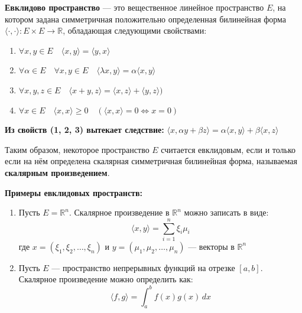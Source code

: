 \begin{shdef}
    \begin{definition}
        \leavevmode\newline
        
        \textbf{Евклидово пространство} — это вещественное линейное пространство $E$, на котором задана симметричная положительно определенная билинейная форма $\langle \cdot, \cdot \rangle: E \times E \to \mathbb{R}$, обладающая следующими свойствами:
        \begin{enumerate}
            \item $\forall x, y \in E \quad \langle x, y \rangle = \langle y, x \rangle$
            \item $\forall \alpha \in E \quad \forall x, y \in E \quad \langle \lambda x, y \rangle = \alpha \langle x, y \rangle$
            \item $\forall x, y, z \in E \quad \langle x + y,z \rangle = \langle x,z \rangle + \langle y,z \rangle)$
            \item $\forall x \in E \quad \langle x, x \rangle \geq 0 \quad (\langle x,x \rangle = 0 \Longleftrightarrow x = 0)$
        \end{enumerate}
        \vspace{0.3cm}
        \textbf{Из свойств (1, 2, 3) вытекает следствие:} $\langle x, \alpha y + \beta z \rangle = \alpha \langle x,y \rangle + \beta \langle x,z \rangle$
    \end{definition}
\end{shdef}
\vspace{2.0cm}
Таким образом, некоторое пространство $E$ считается евклидовым, если и только если на нём определена скалярная симметричная билинейная форма, называемая \textbf{скалярным произведением}.

\clearpage
\textbf{Примеры евклидовых пространств:}
\begin{shex}
    \begin{enumerate}
        \item
        Пусть $E = \mathbb{R}^n$.
        Скалярное произведение в $\mathbb{R}^n$ можно записать в виде:
        \[
        \langle x, y \rangle = \sum_{i=1}^n \xi_i \mu_i
        \]
        где $x = (\xi_1, \xi_2, \ldots, \xi_n)$ и $y = (\mu_1, \mu_2, \ldots, \mu_n)$ — векторы в $\mathbb{R}^n$
        
        \clearpage
        \item
        Пусть $E$ — пространство непрерывных функций на отрезке $[a, b]$.
        \newline 
        Скалярное произведение можно определить как:
        \[
        \langle f, g \rangle = \int_a^b f(x) g(x) \, dx
        \]
        
    \end{enumerate}
\end{shex}

